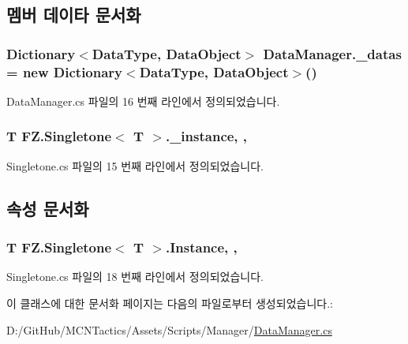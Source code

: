 \subsection{멤버 데이타 문서화}
\subsubsection[{\texorpdfstring{\+\_\+datas}{_datas}}]{\setlength{\rightskip}{0pt plus 5cm}Dictionary$<${\bf Data\+Type}, {\bf Data\+Object}$>$ Data\+Manager.\+\_\+datas = new Dictionary$<${\bf Data\+Type}, {\bf Data\+Object}$>$()\hspace{0.3cm}{\ttfamily [private]}}\hypertarget{class_data_manager_a01ff3ff6f614ac0840d1209110710666}{}\label{class_data_manager_a01ff3ff6f614ac0840d1209110710666}


Data\+Manager.\+cs 파일의 16 번째 라인에서 정의되었습니다.

\subsubsection[{\texorpdfstring{\+\_\+instance}{_instance}}]{\setlength{\rightskip}{0pt plus 5cm}T {\bf F\+Z.\+Singletone}$<$ T $>$.\+\_\+instance\hspace{0.3cm}{\ttfamily [static]}, {\ttfamily [protected]}, {\ttfamily [inherited]}}\hypertarget{class_f_z_1_1_singletone_a1da3d44c1904d88e6fc0252c9333c221}{}\label{class_f_z_1_1_singletone_a1da3d44c1904d88e6fc0252c9333c221}


Singletone.\+cs 파일의 15 번째 라인에서 정의되었습니다.



\subsection{속성 문서화}
\subsubsection[{\texorpdfstring{Instance}{Instance}}]{\setlength{\rightskip}{0pt plus 5cm}T {\bf F\+Z.\+Singletone}$<$ T $>$.Instance\hspace{0.3cm}{\ttfamily [static]}, {\ttfamily [get]}, {\ttfamily [inherited]}}\hypertarget{class_f_z_1_1_singletone_a8e7ba3cf5cff48b1101428beefcd76b4}{}\label{class_f_z_1_1_singletone_a8e7ba3cf5cff48b1101428beefcd76b4}


Singletone.\+cs 파일의 18 번째 라인에서 정의되었습니다.



이 클래스에 대한 문서화 페이지는 다음의 파일로부터 생성되었습니다.\+:\begin{DoxyCompactItemize}
\item 
D\+:/\+Git\+Hub/\+M\+C\+N\+Tactics/\+Assets/\+Scripts/\+Manager/\hyperlink{_data_manager_8cs}{Data\+Manager.\+cs}\end{DoxyCompactItemize}
